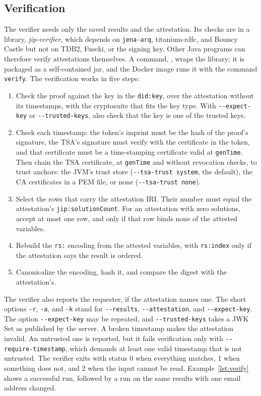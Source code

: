 \documentclass[11pt,a4paper]{article}
\newcommand{\code}[1]{\texttt{#1}}
\newcommand{\file}[1]{\textit{#1}}
\begin{document}
\subsection{Verification}
\label{sec:verification}

The verifier needs only the saved results and the attestation. Its checks are in a library,
\file{jip-verifier}, which depends on \code{jena-arq}, titanium-rdfc, and Bouncy Castle but not
on TDB2, Fuseki, or the signing key. Other Java programs can therefore verify attestations
themselves. A command, , wraps the library; it is packaged as a
self-contained jar, and the Docker image runs it with the command \code{verify}. The
verification works in five steps:

\begin{enumerate}
\item Check the proof against the key in the \code{did:key}, over the attestation without its
  timestamps, with the cryptosuite that fits the key type. With \code{-{}-expect-key} or
  \code{-{}-trusted-keys}, also check that the key is one of the trusted keys.
\item Check each timestamp: the token's imprint must be the hash of the proof's signature, the
  TSA's signature must verify with the certificate in the token, and that certificate must be
  a time-stamping certificate valid at \code{genTime}. Then chain the TSA certificate, at
  \code{genTime} and without revocation checks, to trust anchors: the JVM's trust store
  (\code{-{}-tsa-trust system}, the default), the CA certificates in a PEM file, or none
  (\code{-{}-tsa-trust none}).
\item Select the rows that carry the attestation IRI. Their number must equal the
  attestation's \code{jip:solutionCount}. For an attestation with zero solutions, accept at most
  one row, and only if that row binds none of the attested variables.
\item Rebuild the \code{rs:} encoding from the attested variables, with \code{rs:index} only
  if the attestation says the result is ordered.
\item Canonicalize the encoding, hash it, and compare the digest with the attestation's.
\end{enumerate}

The verifier also reports the requester, if the attestation names one. The short options
\code{-r}, \code{-a}, and \code{-k} stand for \code{-{}-results}, \code{-{}-attestation}, and
\code{-{}-expect-key}. The option \code{-{}-expect-key} may be repeated, and \code{-{}-trusted-keys}
takes a JWK Set as published by the server. A broken timestamp makes the attestation invalid. An untrusted one is
reported, but it fails verification only with \code{-{}-require-timestamp}, which demands at
least one valid timestamp that is not untrusted. The verifier exits with
status 0 when everything matches, 1 when something does not, and 2 when the input
cannot be read. Example~\ref{lst:verify} shows a successful run, followed by a run on the same
results with one email address changed.
\end{document}
